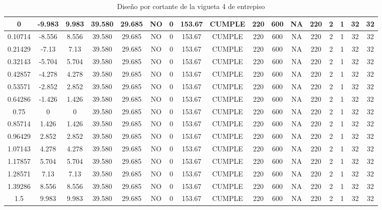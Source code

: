 \begin{table}[H]
{\begin{tabular}{|c|c|c|c|c|c|c|c|c|c|c|c|c|c|c|c|c|}
    \hline
    0   & -9.983 & 9.983 & 39.580 & 29.685 & NO  & 0   & 153.67 & CUMPLE & 220 & 600 & NA  & 220 & 2   & 1   & 32  & 32 \bigstrut\\
    \hline
    0.10714 & -8.556 & 8.556 & 39.580 & 29.685 & NO  & 0   & 153.67 & CUMPLE & 220 & 600 & NA  & 220 & 2   & 1   & 32  & 32 \bigstrut\\
    \hline
    0.21429 & -7.13 & 7.13 & 39.580 & 29.685 & NO  & 0   & 153.67 & CUMPLE & 220 & 600 & NA  & 220 & 2   & 1   & 32  & 32 \bigstrut\\
    \hline
    0.32143 & -5.704 & 5.704 & 39.580 & 29.685 & NO  & 0   & 153.67 & CUMPLE & 220 & 600 & NA  & 220 & 2   & 1   & 32  & 32 \bigstrut\\
    \hline
    0.42857 & -4.278 & 4.278 & 39.580 & 29.685 & NO  & 0   & 153.67 & CUMPLE & 220 & 600 & NA  & 220 & 2   & 1   & 32  & 32 \bigstrut\\
    \hline
    0.53571 & -2.852 & 2.852 & 39.580 & 29.685 & NO  & 0   & 153.67 & CUMPLE & 220 & 600 & NA  & 220 & 2   & 1   & 32  & 32 \bigstrut\\
    \hline
    0.64286 & -1.426 & 1.426 & 39.580 & 29.685 & NO  & 0   & 153.67 & CUMPLE & 220 & 600 & NA  & 220 & 2   & 1   & 32  & 32 \bigstrut\\
    \hline
    0.75 & 0 & 0 & 39.580 & 29.685 & NO  & 0   & 153.67 & CUMPLE & 220 & 600 & NA  & 220 & 2   & 1   & 32  & 32 \bigstrut\\
    \hline
    0.85714 & 1.426 & 1.426 & 39.580 & 29.685 & NO  & 0   & 153.67 & CUMPLE & 220 & 600 & NA  & 220 & 2   & 1   & 32  & 32 \bigstrut\\
    \hline
    0.96429 & 2.852 & 2.852 & 39.580 & 29.685 & NO  & 0   & 153.67 & CUMPLE & 220 & 600 & NA  & 220 & 2   & 1   & 32  & 32 \bigstrut\\
    \hline
    1.07143 & 4.278 & 4.278 & 39.580 & 29.685 & NO  & 0   & 153.67 & CUMPLE & 220 & 600 & NA  & 220 & 2   & 1   & 32  & 32 \bigstrut\\
    \hline
    1.17857 & 5.704 & 5.704 & 39.580 & 29.685 & NO  & 0   & 153.67 & CUMPLE & 220 & 600 & NA  & 220 & 2   & 1   & 32  & 32 \bigstrut\\
    \hline
    1.28571 & 7.13 & 7.13 & 39.580 & 29.685 & NO  & 0   & 153.67 & CUMPLE & 220 & 600 & NA  & 220 & 2   & 1   & 32  & 32 \bigstrut\\
    \hline
    1.39286 & 8.556 & 8.556 & 39.580 & 29.685 & NO  & 0   & 153.67 & CUMPLE & 220 & 600 & NA  & 220 & 2   & 1   & 32  & 32 \bigstrut\\
    \hline
    1.5 & 9.983 & 9.983 & 39.580 & 29.685 & NO  & 0   & 153.67 & CUMPLE & 220 & 600 & NA  & 220 & 2   & 1   & 32  & 32 \bigstrut\\
    \hline
    
    \end{tabular}}%
    \caption{Diseño por cortante de la vigueta 4 de entrepiso}
  \label{tab:CORT VT4 EP}%
\end{table}%
